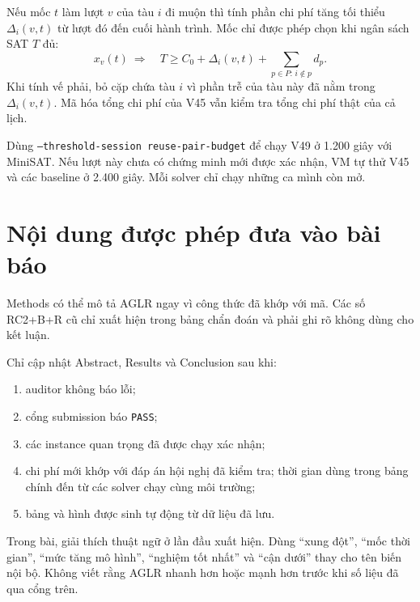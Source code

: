 \documentclass[11pt,a4paper]{article}
\newcommand{\code}[1]{\texttt{#1}}
\begin{document}
Nếu mốc $t$ làm lượt $v$ của tàu $i$ đi muộn thì tính phần
chi phí tăng tối thiểu $\Delta_i(v,t)$ từ lượt đó đến cuối
hành trình. Mốc chỉ được phép chọn khi ngân sách SAT $T$ đủ:
\[
 x_v(t)\ \Longrightarrow\quad
 T \ge C_0 + \Delta_i(v,t) +
       \sum_{p\in P:\,i\notin p} d_p.
\]
Khi tính vế phải, bỏ cặp chứa tàu $i$ vì phần trễ của tàu này
đã nằm trong $\Delta_i(v,t)$. Mã hóa tổng chi phí của V45 vẫn
kiểm tra tổng chi phí thật của cả lịch.

Dùng \code{--threshold-session reuse-pair-budget} để chạy
V49 ở 1.200 giây với MiniSAT. Nếu lượt này chưa có chứng
minh mới được xác nhận, VM tự thử V45 và các baseline ở
2.400 giây. Mỗi solver chỉ chạy những ca mình còn mở.

\section{Nội dung được phép đưa vào bài báo}

Methods có thể mô tả AGLR ngay vì công thức đã khớp với mã. Các số RC2+B+R cũ
chỉ xuất hiện trong bảng chẩn đoán và phải ghi rõ không dùng cho kết luận.

Chỉ cập nhật Abstract, Results và Conclusion sau khi:

\begin{enumerate}
\item auditor không báo lỗi;
\item cổng submission báo \code{PASS};
\item các instance quan trọng đã được chạy xác nhận;
\item chi phí mới khớp với đáp án hội nghị đã kiểm tra; thời gian dùng trong
      bảng chính đến từ các solver chạy cùng môi trường;
\item bảng và hình được sinh tự động từ dữ liệu đã lưu.
\end{enumerate}

Trong bài, giải thích thuật ngữ ở lần đầu xuất hiện. Dùng ``xung đột'', ``mốc
thời gian'', ``mức tăng mô hình'', ``nghiệm tốt nhất'' và ``cận dưới'' thay cho
tên biến nội bộ. Không viết rằng AGLR nhanh hơn hoặc mạnh hơn trước khi số liệu
đã qua cổng trên.
\end{document}
